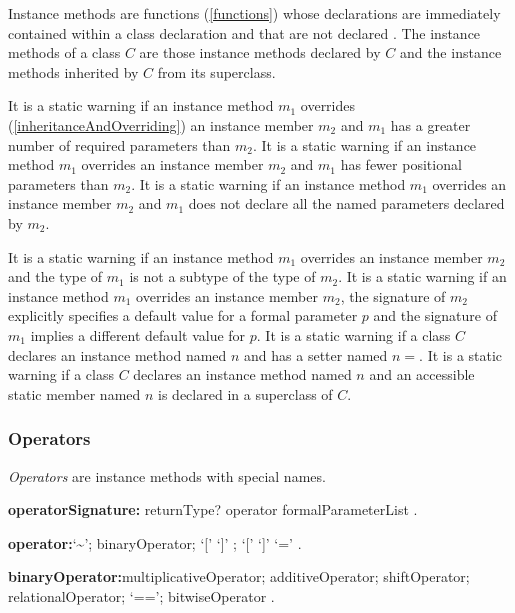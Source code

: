 \documentclass{article}
\begin{document}
\LMHash{}
Instance methods are functions (\ref{functions}) whose declarations are immediately contained within a class declaration and that are not declared \STATIC{}. The instance methods of a class $C$ are those instance methods declared by $C$ and the instance methods inherited by $C$ from its superclass.


\LMHash{}
It is a static warning if an instance method $m_1$ overrides  (\ref{inheritanceAndOverriding}) an instance member $m_2$ and  $m_1$ has a greater number of required parameters than $m_2$. It is a static warning if an instance method $m_1$ overrides  an instance member $m_2$ and  $m_1$ has fewer positional parameters than $m_2$.  It is a static warning if an instance method $m_1$ overrides  an instance member $m_2$ and  $m_1$ does not declare all the named parameters declared by $m_2$. 


\LMHash{}
It is a static warning if an instance method $m_1$ overrides an instance member $m_2$ and the type of $m_1$ is not a subtype of the type of $m_2$. It is a static warning if an instance method $m_1$ overrides an instance member $m_2$,  the signature of $m_2$ explicitly specifies a default value for a formal parameter $p$ and the signature of $m_1$ implies a different default value for $p$. It is a static warning if a class $C$ declares an instance method named $n$ and has a setter named $n=$. It is a static warning if a class $C$ declares an instance method named $n$ and an accessible static member named $n$ is declared in a superclass of $C$.



\subsubsection{Operators}

\LMHash{}
{\em Operators} are instance methods with special names. 

\begin{grammar}
{\bf operatorSignature:}
       returnType? \OPERATOR{} operator formalParameterList
       .
       
 {\bf operator:}`\~{}';
      binaryOperator;
      `[' `]' ;
      `[' `]' `='
    .

{\bf binaryOperator:}multiplicativeOperator;
      additiveOperator;
      shiftOperator;
      relationalOperator;
      `==';
      bitwiseOperator
    .
 \end{grammar}
\end{document}
